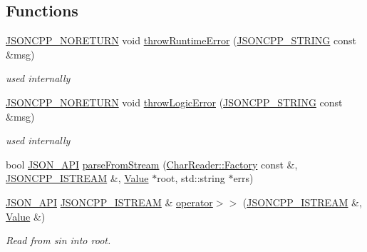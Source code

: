 \subsection*{Functions}
\begin{DoxyCompactItemize}
\item 
\hyperlink{value_8h_a78c5ba441d8b48f24a5095b97f01f282}{J\+S\+O\+N\+C\+P\+P\+\_\+\+N\+O\+R\+E\+T\+U\+RN} void \hyperlink{namespace_json_a0ab7ff7f99788262d92d9ff3d924e065}{throw\+Runtime\+Error} (\hyperlink{config_8h_a1e723f95759de062585bc4a8fd3fa4be}{J\+S\+O\+N\+C\+P\+P\+\_\+\+S\+T\+R\+I\+NG} const \&msg)
\begin{DoxyCompactList}\small\item\em used internally \end{DoxyCompactList}\item 
\hyperlink{value_8h_a78c5ba441d8b48f24a5095b97f01f282}{J\+S\+O\+N\+C\+P\+P\+\_\+\+N\+O\+R\+E\+T\+U\+RN} void \hyperlink{namespace_json_a27790f21f17922fac81e7cd72a5659a5}{throw\+Logic\+Error} (\hyperlink{config_8h_a1e723f95759de062585bc4a8fd3fa4be}{J\+S\+O\+N\+C\+P\+P\+\_\+\+S\+T\+R\+I\+NG} const \&msg)
\begin{DoxyCompactList}\small\item\em used internally \end{DoxyCompactList}\item 
bool \hyperlink{config_8h_a1d61ffde86ce1a18fd83194ff0d9a206}{J\+S\+O\+N\+\_\+\+A\+PI} \hyperlink{namespace_json_aab0cf1ecf81d1aeca12be2a416a84352}{parse\+From\+Stream} (\hyperlink{class_json_1_1_char_reader_1_1_factory}{Char\+Reader\+::\+Factory} const \&, \hyperlink{config_8h_a15f2f70b2ce0a2abd0f8112393dbc4de}{J\+S\+O\+N\+C\+P\+P\+\_\+\+I\+S\+T\+R\+E\+AM} \&, \hyperlink{class_json_1_1_value}{Value} $\ast$root, std\+::string $\ast$errs)
\item 
\hyperlink{config_8h_a1d61ffde86ce1a18fd83194ff0d9a206}{J\+S\+O\+N\+\_\+\+A\+PI} \hyperlink{config_8h_a15f2f70b2ce0a2abd0f8112393dbc4de}{J\+S\+O\+N\+C\+P\+P\+\_\+\+I\+S\+T\+R\+E\+AM} \& \hyperlink{namespace_json_a01f08004efa8a401e01ebd17be77dc71}{operator$>$$>$} (\hyperlink{config_8h_a15f2f70b2ce0a2abd0f8112393dbc4de}{J\+S\+O\+N\+C\+P\+P\+\_\+\+I\+S\+T\+R\+E\+AM} \&, \hyperlink{class_json_1_1_value}{Value} \&)
\begin{DoxyCompactList}\small\item\em Read from \textquotesingle{}sin\textquotesingle{} into \textquotesingle{}root\textquotesingle{}. \end{DoxyCompactList}\item 

\end{DoxyCompactItemize}
